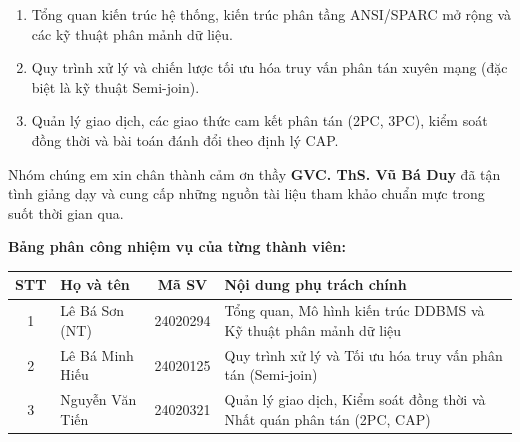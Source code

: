 \documentclass[12pt,a4paper]{report}
\begin{document}
\begin{enumerate}[topsep=2pt, itemsep=1pt, parsep=0pt, leftmargin=1cm]
    \item Tổng quan kiến trúc hệ thống, kiến trúc phân tầng ANSI/SPARC mở rộng và các kỹ thuật phân mảnh dữ liệu.
    \item Quy trình xử lý và chiến lược tối ưu hóa truy vấn phân tán xuyên mạng (đặc biệt là kỹ thuật Semi-join).
    \item Quản lý giao dịch, các giao thức cam kết phân tán (2PC, 3PC), kiểm soát đồng thời và bài toán đánh đổi theo định lý CAP.
\end{enumerate}

Nhóm chúng em xin chân thành cảm ơn thầy \textbf{GVC. ThS. Vũ Bá Duy} đã tận tình giảng dạy và cung cấp những nguồn tài liệu tham khảo chuẩn mực trong suốt thời gian qua.

\vspace{0.3cm}
\noindent\textbf{Bảng phân công nhiệm vụ của từng thành viên:}

\vspace{0.2cm}
\begin{center}
    \renewcommand{\arraystretch}{1.2}
    \begin{tabularx}{\textwidth}{|c|l|c|X|}
        \hline
        \textbf{STT} & \textbf{Họ và tên} & \textbf{Mã SV} & \textbf{Nội dung phụ trách chính} \\
        \hline
        1 & Lê Bá Sơn (NT) & 24020294 & Tổng quan, Mô hình kiến trúc DDBMS và Kỹ thuật phân mảnh dữ liệu \\
        \hline
        2 & Lê Bá Minh Hiếu & 24020125 & Quy trình xử lý và Tối ưu hóa truy vấn phân tán (Semi-join) \\
        \hline
        3 & Nguyễn Văn Tiến & 24020321 & Quản lý giao dịch, Kiểm soát đồng thời và Nhất quán phân tán (2PC, CAP) \\
        \hline
    \end{tabularx}
\end{center}

\newpage

\tableofcontents
\newpage


\end{document}
